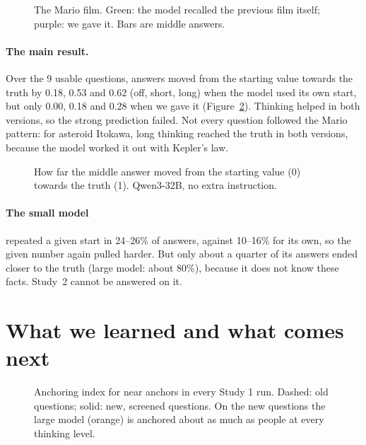 \documentclass[11pt,a4paper]{article}
\begin{document}
\begin{figure}[ht]
\centering{}
\caption{The Mario film. Green: the model recalled the previous film itself; purple: we gave it. Bars are middle answers.}
\label{fig:mario}
\end{figure}

\paragraph{The main result.} Over the 9 usable questions, answers moved from the starting value towards the truth by 0.18, 0.53 and 0.62 (off, short, long) when the model used its own start, but only 0.00, 0.18 and 0.28 when we gave it (Figure~\ref{fig:s2}). Thinking helped in both versions, so the strong prediction failed. Not every question followed the Mario pattern: for asteroid Itokawa, long thinking reached the truth in both versions, because the model worked it out with Kepler's law.

\begin{figure}[ht]
\centering{}
\caption{How far the middle answer moved from the starting value (0) towards the truth (1). Qwen3-32B, no extra instruction.}
\label{fig:s2}
\end{figure}

\paragraph{The small model} repeated a given start in 24--26\% of answers, against 10--16\% for its own, so the given number again pulled harder. But only about a quarter of its answers ended closer to the truth (large model: about 80\%), because it does not know these facts. Study~2 cannot be answered on it.

\section{What we learned and what comes next}

\begin{figure}[ht]
\centering{}
\caption{Anchoring index for near anchors in every Study 1 run. Dashed: old questions; solid: new, screened questions. On the new questions the large model (orange) is anchored about as much as people at every thinking level.}
\label{fig:all}
\end{figure}
\end{document}
